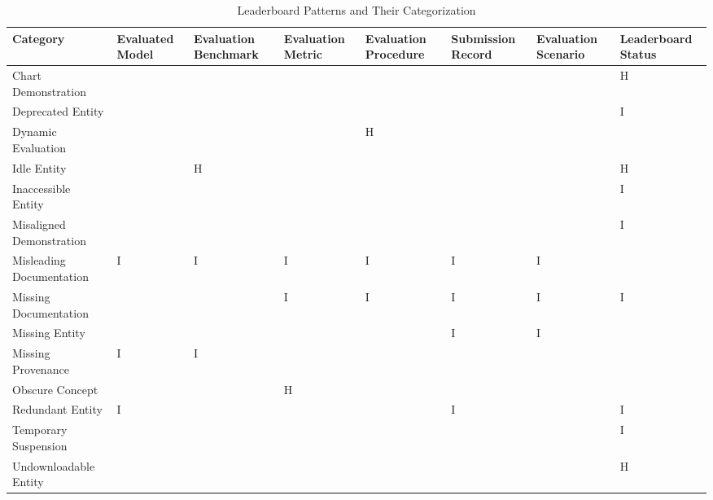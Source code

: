 \begin{table}
\caption{Leaderboard Patterns and Their Categorization}
\label{tab:pattern}
\begin{tabular}{llllllll}
\toprule
Category & Evaluated Model & Evaluation Benchmark & Evaluation Metric & Evaluation Procedure & Submission Record & Evaluation Scenario & Leaderboard Status \\
\midrule
Chart Demonstration &  &  &  &  &  &  & H \\
Deprecated Entity &  &  &  &  &  &  & I \\
Dynamic Evaluation &  &  &  & H &  &  &  \\
Idle Entity &  & H &  &  &  &  & H \\
Inaccessible Entity &  &  &  &  &  &  & I \\
Misaligned Demonstration &  &  &  &  &  &  & I \\
Misleading Documentation & I & I & I & I & I & I &  \\
Missing Documentation &  &  & I & I & I & I & I \\
Missing Entity &  &  &  &  & I & I &  \\
Missing Provenance & I & I &  &  &  &  &  \\
Obscure Concept &  &  & H &  &  &  &  \\
Redundant Entity & I &  &  &  & I &  & I \\
Temporary Suspension &  &  &  &  &  &  & I \\
Undownloadable Entity &  &  &  &  &  &  & H \\
\bottomrule
\end{tabular}
\end{table}
